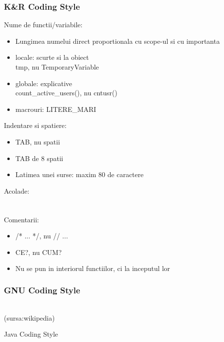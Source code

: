 \documentclass{beamer}
\begin{document}
  \begin{frame}[allowframebreaks]
  \frametitle{K\&R Coding Style}
  Nume de functii/variabile:\vspace{0.5cm}
  \begin{itemize}
  \setlength{\itemsep}{0.3cm}
  \item Lungimea numelui direct proportionala cu scope-ul si cu importanta
  \item locale: scurte si la obiect\\tmp, nu TemporaryVariable
  \item globale: explicative\\count\_active\_users(), nu cntusr()
  \item macrouri: LITERE\_MARI
  \end{itemize}
  \framebreak
  Indentare si spatiere:\vspace{0.5cm}
  \begin{itemize}
  \setlength{\itemsep}{0.3cm}
  \item TAB, nu spatii
  \item TAB de 8 spatii
  \item Latimea unei surse: maxim 80 de caractere
  \end{itemize}
  \framebreak
  Acolade:\\ \vspace{0.5cm}  \\ \framebreak  \\
  \framebreak
  Comentarii:\\\vspace{0.5cm}
  \begin{itemize}
  \setlength{\itemsep}{0.3cm}
  \item {\ttfamily /*  ...  */}, nu {\ttfamily //  ...}
  \item CE?, nu CUM?
  \item Nu se pun in interiorul functiilor, ci la inceputul lor\\\vspace{0.2cm}
  \end{itemize}
  
  \end{frame}

  \begin{frame}[allowframebreaks]
  \frametitle{GNU Coding Style}
   \\ {\footnotesize  (sursa:wikipedia)}
  \end{frame}

  \begin{frame}{Java Coding Style}
  
  \end{frame}
\end{document}
